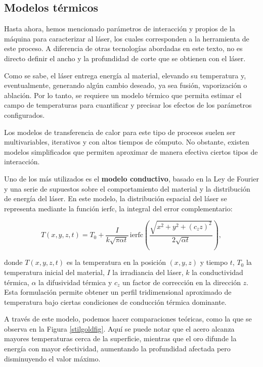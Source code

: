 \subsection{Modelos térmicos}

Hasta ahora, hemos mencionado parámetros de interacción y propios de la máquina para caracterizar al láser, los cuales corresponden a la herramienta de este proceso. A diferencia de otras tecnologías abordadas en este texto, no es directo definir el ancho y la profundidad de corte que se obtienen con el láser.

Como se sabe, el láser entrega energía al material, elevando su temperatura y, eventualmente, generando algún cambio deseado, ya sea fusión, vaporización o ablación. Por lo tanto, se requiere un modelo térmico que permita estimar el campo de temperaturas para cuantificar y precisar los efectos de los parámetros configurados.

Los modelos de transferencia de calor para este tipo de procesos suelen ser multivariables, iterativos y con altos tiempos de cómputo. No obstante, existen modelos simplificados que permiten aproximar de manera efectiva ciertos tipos de interacción.

Uno de los más utilizados es el \textbf{modelo conductivo}, basado en la Ley de Fourier y una serie de supuestos sobre el comportamiento del material y la distribución de energía del láser. En este modelo, la distribución espacial del láser se representa mediante la función $\mathrm{ierfc}$, la integral del error complementario:

\begin{equation}
	T(x,y,z,t) = T_0 + \frac{I}{k \sqrt{\pi \alpha t}} \, 
	\mathrm{ierfc}\left(\frac{\sqrt{x^2 + y^2 + (c_z z)^2}}{2\sqrt{\alpha t}}\right),
\end{equation}

donde $T(x,y,z,t)$ es la temperatura en la posición $(x,y,z)$ y tiempo $t$, $T_0$ la temperatura inicial del material, $I$ la irradiancia del láser, $k$ la conductividad térmica, $\alpha$ la difusividad térmica y $c_z$ un factor de corrección en la dirección $z$. Esta formulación permite obtener un perfil tridimensional aproximado de temperatura bajo ciertas condiciones de conducción térmica dominante.

A través de este modelo, podemos hacer comparaciones teóricas, como la que se observa en la Figura \ref{stilgoldfig}. Aquí se puede notar que el acero alcanza mayores temperaturas cerca de la superficie, mientras que el oro difunde la energía con mayor efectividad, aumentando la profundidad afectada pero disminuyendo el valor máximo.

